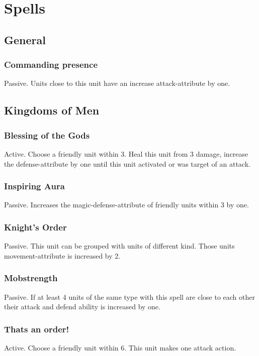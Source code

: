 \documentclass[a5paper,pagesize,10pt,bibtotoc,pointlessnumbers,
normalheadings,DIV=9,twoside=false]{scrbook}
\begin{document}
\section{Spells}

\subsection{General}

\subsubsection{Commanding presence}
Passive. Units close to this unit have an increase attack-attribute by one.


\newpage
\subsection{Kingdoms of Men}

\subsubsection{Blessing of the Gods}
Active. Choose a friendly unit within 3. Heal this unit from 3 damage, increase the defense-attribute by one until this unit activated or was target of an attack.

\subsubsection{Inspiring Aura}
Passive. Increases the magic-defense-attribute of friendly units within 3 by one.

\subsubsection{Knight's Order}
Passive. This unit can be grouped with units of different kind. Those units movement-attribute is increased by 2.

\subsubsection{Mobstrength}
Passive. If at least 4 units of the same type with this spell are close to each other their attack and defend ability is increased by one.

\subsubsection{Thats an order!}
Active. Choose a friendly unit within 6. This unit makes one attack action.
\end{document}
